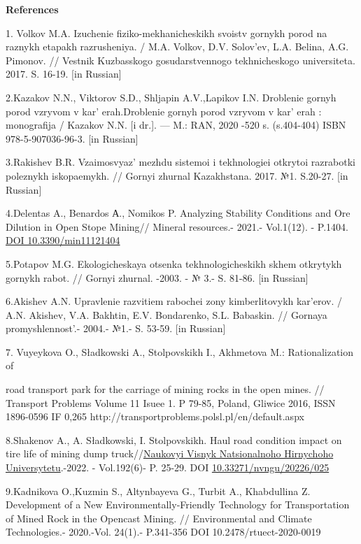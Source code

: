 {\bfseries References}

1. Volkov M.A. Izuchenie fiziko-mekhanicheskikh svoistv gornykh porod na
raznykh etapakh razrusheniya. / M.A. Volkov, D.V. Solov'ev, L.A. Belina,
A.G. Pimonov. // Vestnik Kuzbasskogo gosudarstvennogo tekhnicheskogo
universiteta. 2017. S. 16-19. {[}in Russian{]}

2.Kazakov N.N., Viktorov S.D., Shljapin A.V.,Lapikov I.N. Droblenie
gornyh porod vzryvom v kar' erah.Droblenie gornyh porod
vzryvom v kar' erah : monografija / Kazakov N.N. {[}i
dr.{]}. --- M.: RAN, 2020 -520 s. (s.404-404) ISBN 978-5-907036-96-3.
{[}in Russian{]}

3.Rakishev B.R. Vzaimosvyaz' mezhdu sistemoi i tekhnologiei otkrytoi
razrabotki poleznykh iskopaemykh. // Gornyi zhurnal Kazakhstana. 2017.
№1. S.20-27. {[}in Russian{]}

4.Delentas A., Benardos А., Nomikos P. Analyzing Stability Conditions
and Ore Dilution in Open Stope Mining// Mineral resources.- 2021.-
Vol.1(12). - P.1404. \href{https://doi.org/10.3390/min11121404}{DOI
10.3390/min11121404}

5.Potapov M.G. Ekologicheskaya otsenka tekhnologicheskikh skhem
otkrytykh gornykh rabot. // Gornyi zhurnal. -2003. - № 3.- S. 81-86.
{[}in Russian{]}

6.Akishev A.N. Upravlenie razvitiem rabochei zony kimberlitovykh
kar'erov. / A.N. Akishev, V.A. Bakhtin, E.V. Bondarenko, S.L. Babaskin.
// Gornaya promyshlennost'.- 2004.- №1.- S. 53-59. {[}in Russian{]}

7. Vuyeykova O., Sładkowski A., Stolpovskikh I., Akhmetova M.:
Rationalization of

road transport park for the carriage of mining rocks in the open mines.
// Transport Problems Volume 11 Isuee 1. P 79-85, Poland, Gliwice 2016,
ISSN 1896-0596 IF 0,265
http://transportproblems.polsl.pl/en/default.aspx

8.Shakenov A., A. Sładkowski, I. Stolpovskikh. Haul road condition
impact on tire life of mining dump
truck//\href{https://www.researchgate.net/journal/Naukovyi-Visnyk-Natsionalnoho-Hirnychoho-Universytetu-2223-2362?_tp=eyJjb250ZXh0Ijp7ImZpcnN0UGFnZSI6InB1YmxpY2F0aW9uIiwicGFnZSI6InB1YmxpY2F0aW9uIn19}{Naukovyi
Visnyk Natsionalnoho Hirnychoho Universytetu}.-2022. - Vol.192(6)- P.
25-29. DOI
\href{http://dx.doi.org/10.33271/nvngu/20226/025}{10.33271/nvngu/20226/025}

9.Kadnikova O.,Kuzmin S., Altynbayeva G., Turbit A., Khabdullina Z.
Development of a New Environmentally-Friendly Technology for
Transportation of Mined Rock in the Opencast Mining. // Environmental
and Climate Technologies.- 2020.-Vol. 24(1).- P.341-356 DOI
10.2478/rtuect-2020-0019

